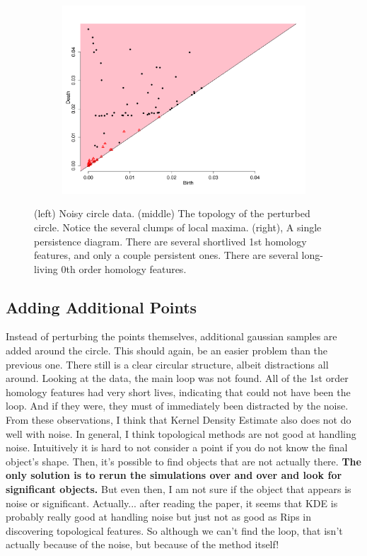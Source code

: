 \documentclass[a4paper]{article}
\begin{document}
\begin{figure}[htp!]
\begin{subfigure}{.32\textwidth}
  \includegraphics[width=\linewidth]{noisycircle3}
\end{subfigure}
\caption{(left) Noisy circle data. (middle) The topology of the perturbed circle. Notice the several clumps of local maxima. (right), A single persistence diagram. There are several shortlived 1st homology features, and only a couple persistent ones. There are several long-living 0th order homology features. }
\end{figure}

\subsection{Adding Additional Points}
Instead of perturbing the points themselves, additional gaussian samples are added around the circle. This should again, be an easier problem than the previous one. There still is a clear circular structure, albeit distractions all around. Looking at the data, the main loop was not found. All of the 1st order homology features had very short lives, indicating that could not have been the loop. And if they were, they must of immediately been distracted by the noise. From these observations, I think that Kernel Density Estimate also does not do well with noise. In general, I think topological methods are not good at handling noise. Intuitively it is hard to not consider a point if you do not know the final object's shape. Then, it's possible to find objects that are not actually there. \textbf{The only solution is to rerun the simulations over and over and look for significant objects.} But even then, I am not sure if the object that appears is noise or significant. Actually... after reading the paper, it seems that KDE is probably really good at handling noise but just not as good as Rips in discovering topological features. So although we can't find the loop, that isn't actually because of the noise, but because of the method itself!
\end{document}
